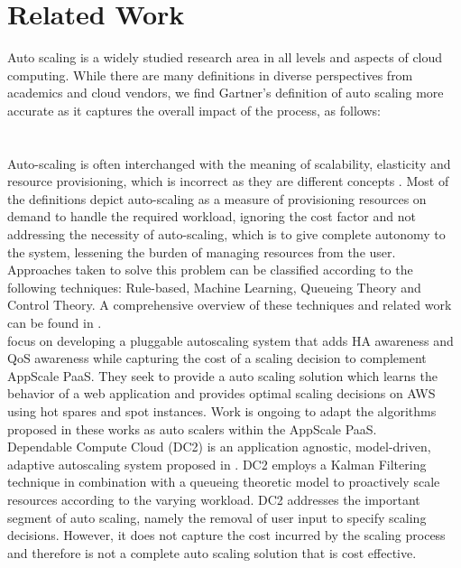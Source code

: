 \section{Related Work}
Auto scaling is a widely studied research area in all levels and aspects of cloud computing. While there are many definitions in diverse perspectives from academics and cloud vendors, we find Gartner’s definition of auto scaling more accurate as it captures the overall impact of the process, as follows:\\\\
\cite{website:gartner}\\

Auto-scaling is often interchanged with the meaning of scalability, elasticity and resource provisioning, which is incorrect as they are different concepts \cite{autoscalingissues}. Most of the definitions depict auto-scaling as a measure of provisioning resources on demand to handle the required workload, ignoring the cost factor and not addressing the necessity of auto-scaling, which is to give complete autonomy to the system, lessening the burden  of managing resources from the user. Approaches taken to solve this problem can be classified according to the following techniques: Rule-based, Machine Learning, Queueing Theory and Control Theory. A comprehensive overview of these techniques and related work can be found in \cite{reviewofautoscaling}.\\

\cite{pluggable} focus on developing a pluggable autoscaling system that adds HA awareness and QoS awareness while capturing the cost of a scaling decision to complement AppScale PaaS. They seek to provide a auto scaling solution which learns the behavior of a web application and provides optimal scaling decisions on AWS using hot spares and spot instances. Work is ongoing to adapt the algorithms proposed in these works as auto scalers within the AppScale PaaS.\\

Dependable Compute Cloud (DC2) is an application agnostic, model-driven, adaptive autoscaling system proposed in \cite{modeldriven}. DC2 employs a Kalman Filtering technique in combination with a queueing theoretic model to proactively scale resources according to the varying workload. DC2 addresses the important segment of auto scaling, namely the removal of user input to specify scaling decisions. However, it does not capture the cost incurred by the scaling process and therefore is not a complete auto scaling solution that is cost effective.\\

